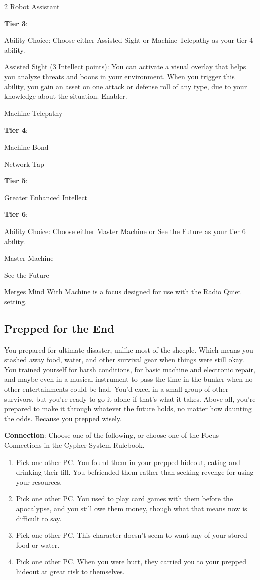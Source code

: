 \begin{multicols}{2}
Robot Assistant

\textbf{Tier 3}:

Ability Choice: Choose either Assisted Sight or Machine Telepathy as your tier 4 ability. 

Assisted Sight (3 Intellect points): You can activate a visual overlay that helps you analyze threats and boons in your environment. When you trigger this ability, you gain an asset on one attack or defense roll of any type, due to your knowledge about the situation. Enabler.

Machine Telepathy

\textbf{Tier 4}:

Machine Bond 

Network Tap

\textbf{Tier 5}:
 
Greater Enhanced Intellect 

\textbf{Tier 6}:

Ability Choice: Choose either Master Machine or See the Future as your tier 6 ability. 

Master Machine 

See the Future

Merges Mind With Machine is a focus designed for use with the Radio Quiet setting. 

\subsection{Prepped for the End}

You prepared for ultimate disaster, unlike most of the sheeple. Which means you stashed away food, water, and other survival gear when things were still okay. You trained yourself for harsh conditions, for basic machine and electronic repair, and maybe even in a musical instrument to pass the time in the bunker when no other entertainments could be had. You’d excel in a small group of other survivors, but you’re ready to go it alone if that’s what it
takes. Above all, you’re prepared to make it through whatever the future holds, no matter how daunting the odds. Because you prepped wisely.

\textbf{Connection}: Choose one of the following, or choose one of the Focus Connections in the Cypher System Rulebook.

\begin{enumerate}
\item Pick one other PC. You found them in your prepped hideout, eating and drinking their fill. You befriended them rather than seeking revenge for using your resources.
\item Pick one other PC. You used to play card games with them before the apocalypse, and you still owe them money, though what that means now is difficult to say.
\item Pick one other PC. This character doesn’t seem to want any of your stored food or water.
\item Pick one other PC. When you were hurt, they carried you to your prepped hideout at great risk to themselves. 
\end{enumerate}


\end{multicols}
